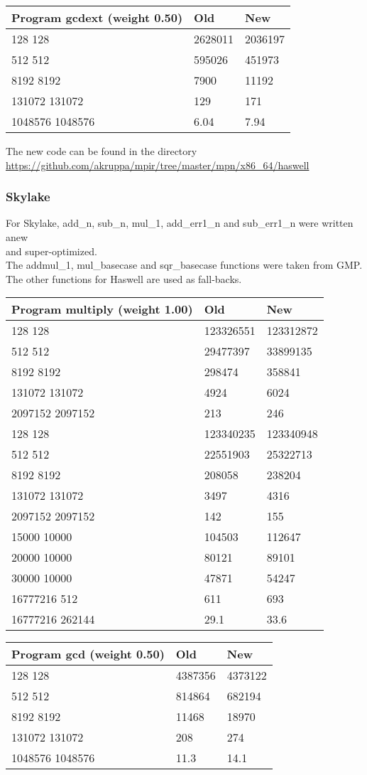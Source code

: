 \begin{longtable}[c]{@{}lll@{}}
\toprule
Program gcdext (weight 0.50) & Old & New\tabularnewline
\midrule
\endhead
128 128 & 2628011 & 2036197\tabularnewline
512 512 & 595026 & 451973\tabularnewline
8192 8192 & 7900 & 11192\tabularnewline
131072 131072 & 129 & 171\tabularnewline
1048576 1048576 & 6.04 & 7.94\tabularnewline
\bottomrule
\end{longtable}

The new code can be found in the directory\\
\url{https://github.com/akruppa/mpir/tree/master/mpn/x86_64/haswell}

\subsubsection{Skylake}\label{skylake}

For Skylake, add\_n, sub\_n, mul\_1, add\_err1\_n and sub\_err1\_n were
written anew\\
and super-optimized.\\
The addmul\_1, mul\_basecase and sqr\_basecase functions were taken from
GMP.\\
The other functions for Haswell are used as fall-backs.

\begin{longtable}[c]{@{}lll@{}}
\toprule
Program multiply (weight 1.00) & Old & New\tabularnewline
\midrule
\endhead
128 128 & 123326551 & 123312872\tabularnewline
512 512 & 29477397 & 33899135\tabularnewline
8192 8192 & 298474 & 358841\tabularnewline
131072 131072 & 4924 & 6024\tabularnewline
2097152 2097152 & 213 & 246\tabularnewline
128 128 & 123340235 & 123340948\tabularnewline
512 512 & 22551903 & 25322713\tabularnewline
8192 8192 & 208058 & 238204\tabularnewline
131072 131072 & 3497 & 4316\tabularnewline
2097152 2097152 & 142 & 155\tabularnewline
15000 10000 & 104503 & 112647\tabularnewline
20000 10000 & 80121 & 89101\tabularnewline
30000 10000 & 47871 & 54247\tabularnewline
16777216 512 & 611 & 693\tabularnewline
16777216 262144 & 29.1 & 33.6\tabularnewline
\bottomrule
\end{longtable}

\begin{longtable}[c]{@{}lll@{}}
\toprule
Program gcd (weight 0.50) & Old & New\tabularnewline
\midrule
\endhead
128 128 & 4387356 & 4373122\tabularnewline
512 512 & 814864 & 682194\tabularnewline
8192 8192 & 11468 & 18970\tabularnewline
131072 131072 & 208 & 274\tabularnewline
1048576 1048576 & 11.3 & 14.1\tabularnewline
\bottomrule
\end{longtable}


